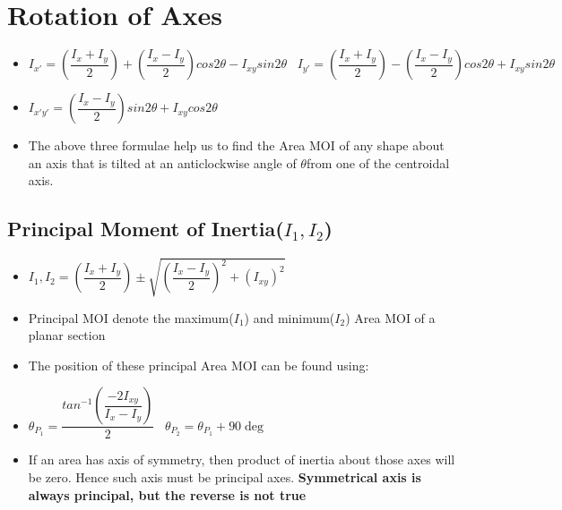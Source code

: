 \documentclass[8pt]{report}
\begin{document}
	\section{Rotation of Axes}
		\begin{itemize}
			\item $\boxed{I_{x'} = \left(\dfrac{I_x+I_y}{2}\right)+\left(\dfrac{I_x-I_y}{2}\right)cos2\theta-I_{xy}sin2\theta}\;\;\;\boxed{I_{y'} = \left(\dfrac{I_x+I_y}{2}\right)-\left(\dfrac{I_x-I_y}{2}\right)cos2\theta+I_{xy}sin2\theta}$
			\item $\boxed{I_{x'y'} = \left(\dfrac{I_x-I_y}{2}\right)sin2\theta+I_{xy}cos2\theta}$
			\item The above three formulae help us to find the Area MOI of any shape about an axis that is tilted at an anticlockwise angle of $\theta$\textdegree from one of the centroidal axis. 		
		\end{itemize}\hrulefill
		\subsection{Principal Moment of Inertia($I_1,I_2$)}
			\begin{itemize}
				\item $\boxed{I_1,I_2 = \left(\dfrac{I_x+I_y}{2}\right)\pm\sqrt{\left(\dfrac{I_x-I_y}{2}\right)^2+(I_{xy})^2}}$
				\item Principal MOI denote the maximum($I_1$) and minimum($I_2$) Area MOI of a planar section
				\item The position of these principal Area MOI can be found using:
				\item $\boxed{\theta_{P_1} = \dfrac{tan^{-1}\left(\dfrac{-2I_{xy}}{I_x-I_y}\right)}{2}}\;\;\;\boxed{\theta_{P_2} = \theta_{P_1}+90\deg}$
				\item If an area has axis of symmetry, then product of inertia about those axes will be zero. Hence such axis must be principal axes. \textbf{Symmetrical axis is always principal, but the reverse is not true}
			\end{itemize}\hrulefill
\end{document}
